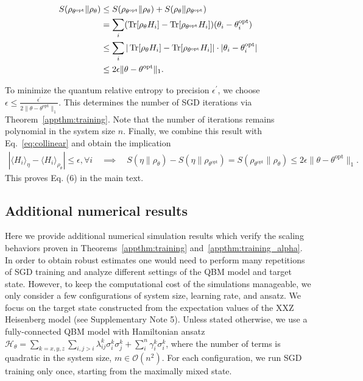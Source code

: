 \documentclass[
    reprint,
    aps,
    prx,
    longbibliography
]{revtex4-2}
\begin{document}
\begin{align}
\begin{split}
\label{eq:up_bound_for_S}
S(\rho_{\theta^\mathrm{opt}} \| \rho_\theta) &\leq S(\rho_{\theta^\mathrm{opt}} \| \rho_\theta) + S(\rho_{\theta} \| \rho_{\theta^\mathrm{opt}}) \\
&= \sum_i ( \Tr[\rho_{\theta} H_i] - \Tr[\rho_{\theta^\mathrm{opt}} H_i] ) ( \theta_i - \theta^\textrm{opt}_i) \\
&\leq \sum_i | \Tr[\rho_{\theta} H_i] - \Tr[\rho_{\theta^\mathrm{opt}} H_i] | \cdot | \theta_i - \theta^\textrm{opt}_i | \\
&\leq 2 \epsilon \| \theta - \theta^\textrm{opt} \|_1 .
\end{split}
\end{align}

To minimize the quantum relative entropy to precision $\epsilon^\prime$, we choose $\epsilon \leq \frac{\epsilon^\prime}{ 2 \| \theta - \theta^\textrm{opt} \|_1 }$. This determines the number of SGD iterations via Theorem~\ref{appthm:training}. Note that the number of iterations remains polynomial in the system size $n$. Finally, we combine this result with Eq.~\eqref{eq:collinear} and obtain the implication
\begin{align}
\label{eq:app_relentropbound}
    |\langle H_{i}\rangle_\eta -\langle H_{i} \rangle_{\rho_\theta} | \leq \epsilon, \forall i \quad \implies \quad S(\eta \| \rho_{\theta}) - S(\eta \| \rho_{\theta^\mathrm{opt}}) = S(\rho_{\theta^\mathrm{opt}} \| \rho_{\theta}) \leq 2 \epsilon \| \theta - \theta^\textrm{opt} \|_1 .
\end{align} 
This proves Eq. (6) in the main text. 

\subsection*{Additional numerical results}

Here we provide additional numerical simulation results which verify the scaling behaviors proven in Theorems~\ref{appthm:training} and~\ref{appthm:training_alpha}. In order to obtain robust estimates one would need to perform many repetitions of SGD training and analyze different settings of the QBM model and target state. However, to keep the computational cost of the simulations manageable, we only consider a few configurations of system size, learning rate, and ansatz. We focus on the target state constructed from the expectation values of the XXZ Heisenberg model (see Supplementary Note 5).
Unless stated otherwise, we use a fully-connected QBM model with Hamiltonian ansatz $\mathcal{H}_\theta = \sum_{k=x,y,z}\sum_{i, j>i}\lambda^k_{ij}\sigma_i^k\sigma^k_j + \sum_i^n \gamma^k_i\sigma^k_i$, where the number of terms is quadratic in the system size, $m \in \mathcal{O}(n^2)$. For each configuration, we run SGD training only once, starting from the maximally mixed state.
\end{document}
